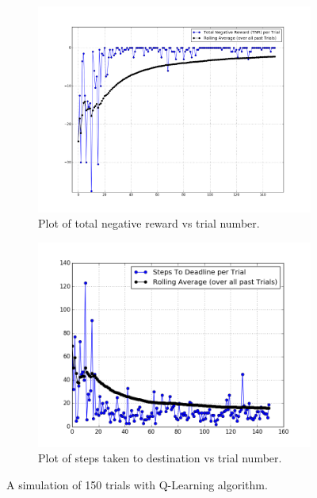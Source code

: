 \documentclass[paper=a4, fontsize=11pt]{scrartcl}
\numberwithin{equation}{section}		%
\numberwithin{figure}{section}			%
\numberwithin{table}{section}				%
\begin{document}
\begin{figure}
	\centering
	\begin{subfigure}{.6\textwidth}
		\centering
		\includegraphics[width= \linewidth]{3_TNR}
		\caption{Plot of total negative reward   vs trial number.}
		\label{fig:sub1}
	\end{subfigure}%
	\begin{subfigure}{.56\textwidth}
		\centering
		\includegraphics[width= \linewidth]{3_STD}
		\caption{Plot of steps taken to destination vs trial number.}
		\label{fig:sub2}
	\end{subfigure}
	\caption{A simulation of 150 trials with Q-Learning algorithm.   }
	\label{fig:test}
\end{figure}
\end{document}
